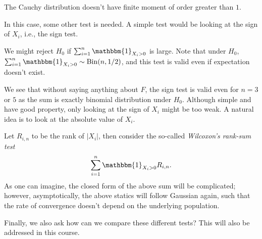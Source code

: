 \begin{eg}
	The Cauchy distribution doesn't have finite moment of order greater than \(1\).
\end{eg}

In this case, some other test is needed. A simple test would be looking at the sign of \(X_i\), i.e., the sign test.

\begin{eg}
	We might reject \(H_0\) if \(\sum_{i=1}^{n} \mathbbm{1}_{X_i > 0} \) is large. Note that under \(H_0\), \(\sum_{i=1}^{n} \mathbbm{1}_{X_i > 0} \sim \operatorname{Bin}(n, 1/2) \), and this test is valid even if expectation doesn't exist.
\end{eg}

We see that without saying anything about \(F\), the sign test is valid even for \(n = 3\) or \(5\) as the sum is exactly binomial distribution under \(H_0\). Although simple and have good property, only looking at the sign of \(X_i\) might be too weak. A natural idea is to look at the absolute value of \(X_i\).

\begin{eg}
	Let \(R_{i, n} \) to be the rank of \(\vert X_i \vert \), then consider the so-called \emph{Wilcoxon's rank-sum test}
	\[
		\sum_{i=1}^{n} \mathbbm{1}_{X_i > 0} R_{i, n}.
	\]
	As one can imagine, the closed form of the above sum will be complicated; however, asymptotically, the above statics will follow Gaussian again, such that the rate of convergence doesn't depend on the underlying population.
\end{eg}

Finally, we also ask how can we compare these different tests? This will also be addressed in this course.
